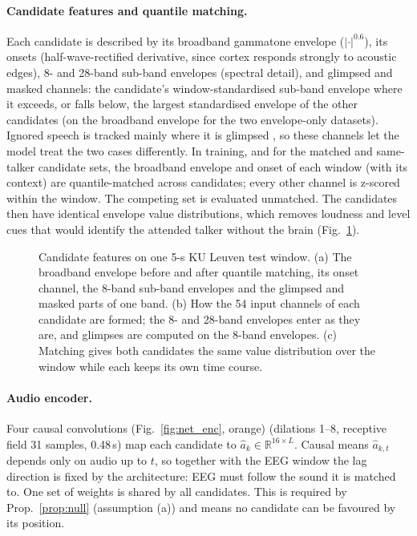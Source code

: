 \documentclass[10pt,twocolumn,letterpaper]{article}
\begin{document}
\paragraph{Candidate features and quantile matching.} Each candidate is described by its
broadband gammatone envelope ($|\cdot|^{0.6}$), its onsets (half-wave-rectified
derivative, since cortex responds strongly to acoustic edges), 8- and 28-band sub-band
envelopes (spectral detail), and glimpsed and masked channels: the candidate's window-standardised
sub-band envelope where it exceeds, or falls below, the largest standardised envelope of the
other candidates (on the broadband envelope for the two envelope-only datasets). Ignored speech is tracked mainly
where it is glimpsed \citep{brodbeck2020neural}, so these channels let the model treat
the two cases differently. In training, and for the matched and same-talker candidate sets, the broadband envelope
and onset of each window (with its context) are quantile-matched across candidates; every
other channel is z-scored within the window. The competing set is evaluated unmatched. The candidates
then have identical envelope value distributions, which removes loudness and level cues that
would identify the attended talker without the brain (Fig.~\ref{fig:net_feat}).

\begin{figure}[t]\centering
\resizebox{\textwidth}{!}{}
\caption{Candidate features on one 5-s KU Leuven test window. (a) The broadband envelope
before and after quantile matching, its onset channel, the 8-band sub-band envelopes and the
glimpsed and masked parts of one band. (b) How the 54 input channels of each candidate are
formed; the 8- and 28-band envelopes enter as they are, and glimpses are computed on the
8-band envelopes. (c) Matching gives both candidates the same value distribution over the
window while each keeps its own time course.}\label{fig:net_feat}
\end{figure}

\paragraph{Audio encoder.} Four causal convolutions (Fig.~\ref{fig:net_enc}, orange) (dilations 1--8, receptive field 31
samples, 0.48\,s) map each candidate to $\hat{a}_k\in\mathbb R^{16\times L}$. Causal
means $\hat a_{k,t}$ depends only on audio up to $t$, so together with the EEG window the
lag direction is fixed by the architecture: EEG must follow the sound it is matched to. One
set of weights is shared by all candidates. This is required by Prop.~\ref{prop:null}
(assumption (a)) and means no candidate can be favoured by its position.
\end{document}
